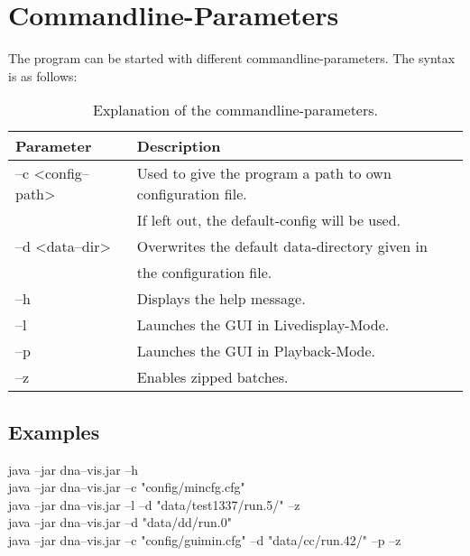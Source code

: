 \chapter{Commandline-Parameters}
The program can be started with different commandline-parameters. The syntax is as follows:\
\


\begin{table}[h]
\centering
\begin{tabular}[h]{|l|l|}\hline
	\textbf{Parameter} & \textbf{Description}\\
	\hline
	--c \textless config--path\textgreater & Used to give the program a path to  own configuration file.\\
	& If left out, the default-config will be used. \\
	\hline
	--d \textless data--dir\textgreater & Overwrites the default data-directory given in \\
	& the configuration file. \\
	\hline
	--h & Displays the help message. \\
	\hline
	--l & Launches the GUI in Livedisplay-Mode.\\
	\hline
	--p & Launches the GUI in Playback-Mode.\\
	\hline
	--z & Enables zipped batches.\\
	\hline
\end{tabular}
\caption{Explanation of the commandline-parameters.}
\label{tab:cmdline1}
\end{table}

\section{Examples}
\begin{flushleft}
java --jar dna--vis.jar --h\\
java --jar dna--vis.jar --c "config/min\textunderscore cfg.cfg"\\
java --jar dna--vis.jar --l --d "data/test1337/run.5/" --z\\
java --jar dna--vis.jar --d "data/dd/run.0"\\
java --jar dna--vis.jar --c "config/gui\textunderscore min.cfg" --d "data/cc/run.42/" --p --z\\
\end{flushleft}